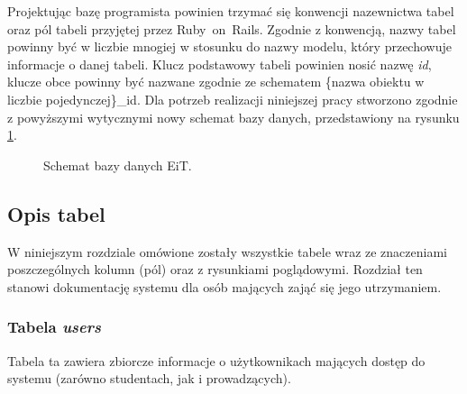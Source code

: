\documentclass[a4paper,12pt,oneside]{report}
\begin{document}
Projektując bazę programista powinien trzymać się konwencji nazewnictwa tabel oraz pól tabeli przyjętej przez Ruby~on~Rails. Zgodnie z konwencją, nazwy tabel powinny być w liczbie mnogiej w stosunku do nazwy modelu, który przechowuje informacje o danej tabeli. Klucz podstawowy tabeli powinien nosić nazwę \emph{id}, klucze obce powinny być nazwane zgodnie ze schematem \{nazwa obiektu w liczbie pojedynczej\}\_id. Dla potrzeb realizacji niniejszej pracy stworzono zgodnie z powyższymi wytycznymi nowy schemat bazy danych, przedstawiony na rysunku \ref{fig:database}.

\newpage
\thispagestyle{empty}
\addtolength{\textwidth}{4cm}
\addtolength{\hoffset}{-2.5cm}
\addtolength{\textheight}{5cm}
\addtolength{\voffset}{-3.5cm}
\begin{landscape}
\begin{figure}
\centering
  \caption{
  Schemat bazy danych EiT.
  \label{fig:database}
  }
\end{figure}
\end{landscape}
\newpage

\addtolength{\textwidth}{-4cm}
\addtolength{\hoffset}{2.5cm}
\addtolength{\textheight}{-5cm}
\addtolength{\voffset}{3.5cm}
\subsection{Opis tabel}
\label{sub:tabele}

W niniejszym rozdziale omówione zostały wszystkie tabele wraz ze znaczeniami poszczególnych kolumn (pól) oraz z rysunkiami poglądowymi. Rozdział ten stanowi dokumentację systemu dla osób mających zająć się jego utrzymaniem.

\subsubsection{Tabela \emph{users}}
\label{subsub:users}
Tabela ta zawiera zbiorcze informacje o użytkownikach mających dostęp do systemu (zarówno studentach, jak i prowadzących).
\end{document}
